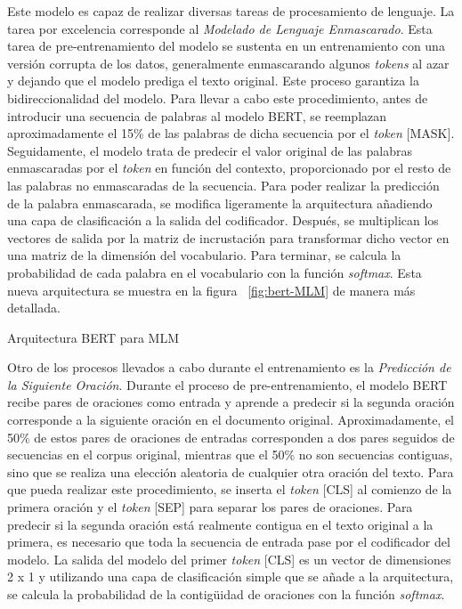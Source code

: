 Este modelo es capaz de realizar diversas tareas de procesamiento de lenguaje. La tarea por excelencia corresponde al \textit{Modelado de Lenguaje Enmascarado}. Esta tarea de pre-entrenamiento del modelo se sustenta en un entrenamiento con una versión corrupta de los datos, generalmente enmascarando algunos \textit{tokens} al azar y dejando que el modelo prediga el texto original. Este proceso garantiza la bidireccionalidad del modelo. Para llevar a cabo este procedimiento, antes de introducir una secuencia de palabras al modelo BERT, se reemplazan aproximadamente el 15\% de las palabras de dicha secuencia por el \textit{token} [MASK]. Seguidamente, el modelo trata de predecir el valor original de las palabras enmascaradas por el \textit{token} en función del contexto, proporcionado por el resto de las palabras no enmascaradas de la secuencia. Para poder realizar la predicción de la palabra enmascarada, se modifica ligeramente la arquitectura añadiendo una capa de clasificación a la salida del codificador. Después, se multiplican los vectores de salida por la matriz de incrustación para transformar dicho vector en una matriz de la dimensión del vocabulario. Para terminar, se calcula la probabilidad de cada palabra en el vocabulario con la función \textit{softmax}. Esta nueva arquitectura se muestra en la figura ~\ref{fig:bert-MLM} de manera más detallada.


%
{Arquitectura BERT para MLM}


Otro de los procesos llevados a cabo durante el entrenamiento es la \textit{Predicción de la Siguiente Oración}. Durante el proceso de pre-entrenamiento, el modelo BERT recibe pares de oraciones como entrada y aprende a predecir si la segunda oración corresponde a la siguiente oración en el documento original. Aproximadamente, el 50\% de estos pares de oraciones de entradas corresponden a dos pares seguidos de secuencias en el corpus original, mientras que el 50\% no son secuencias contiguas, sino que se realiza una elección aleatoria de cualquier otra oración del texto. Para que pueda realizar este procedimiento, se inserta el \textit{token} [CLS] al comienzo de la primera oración y el \textit{token} [SEP] para separar los pares de oraciones.
Para predecir si la segunda oración está realmente contigua en el texto original a la primera, es necesario que toda la secuencia de entrada pase por el codificador del modelo. La salida del modelo del primer \textit{token} [CLS] es un vector de dimensiones 2 x 1 y utilizando una capa de clasificación simple que se añade a la arquitectura, se calcula la probabilidad de la contigüidad de oraciones con la función \textit{softmax}.


